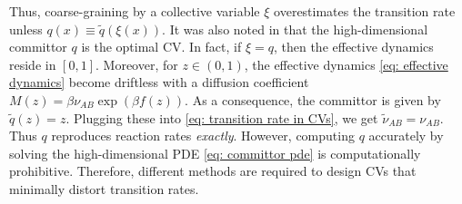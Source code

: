 \documentclass[reqno, 12pt]{article}
\begin{document}
Thus, coarse-graining by a collective variable $\xi$ overestimates the transition rate unless $q(x) \equiv \tilde{q}(\xi(x))$.
It was also noted in \parencite{ZhangHartmannSchutte_2016} that the high-dimensional committor $q$ is the optimal CV. In fact, if $\xi = q$, then the effective dynamics reside in $[0,1]$. Moreover, for $z \in (0,1)$, the effective dynamics \eqref{eq: effective dynamics} become driftless with a diffusion coefficient $M(z) = \beta \nu_{AB}\exp{\left(\beta f(z)\right)}$. As a consequence, the committor is given by $\tilde{q}(z) = z$. Plugging these into \eqref{eq: transition rate in CVs}, we get $\tilde{\nu}_{AB} = \nu_{AB}$. Thus $q$ reproduces reaction rates \emph{exactly}. However, computing $q$ accurately by solving the high-dimensional PDE \eqref{eq: committor pde} is computationally prohibitive. Therefore, different methods are required to design CVs that minimally distort transition rates.



\end{document}
